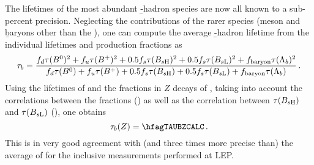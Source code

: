 The lifetimes of the most abundant \b-hadron species are now all known to a sub-percent precision. Neglecting the 
contributions of the rarer species (\Bc meson and \b baryons other than the \Lb), one can compute the average 
\b-hadron lifetime from the individual lifetimes and production fractions as 
\begin{equation}
\tau_b = \frac%
{\fBd \tau(\Bd)^2+ \fBu \tau(\Bu)^2+0.5 \fBs \tau(B_{s\rm H})^2+0.5 \fBs \tau(B_{s\rm L})^2+ \fbb \tau(\Lambda_b)^2}%
{\fBd \tau(\Bd)  + \fBu \tau(\Bu)  +0.5 \fBs \tau(B_{s\rm H})  +0.5 \fBs \tau(B_{s\rm L})  + \fbb \tau(\Lambda_b)  } \,.
\end{equation}
Using the lifetimes of  and the fractions in $Z$ decays of ,
taking into account the correlations between the fractions () as well as the correlation 
between $\tau(B_{s\rm H})$ and $\tau(B_{s\rm L})$ (\hfagZRHOTAUHTAUL), one obtains
\begin{equation}
\tau_b(Z) = \hfagTAUBZCALC \,.
\end{equation}
This is in very good agreement with (and three times more precise than)
the average of  for the inclusive measurements performed at LEP. 
